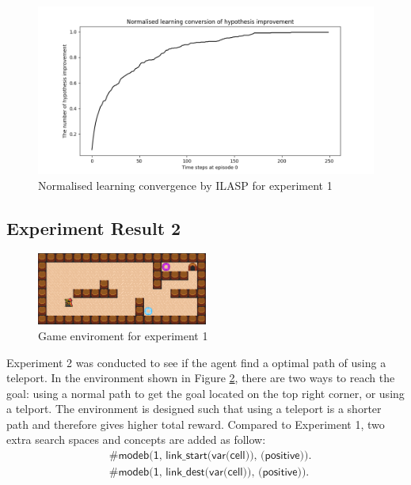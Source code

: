 \begin{figure}[!htb]
\centering
\includegraphics[width=1.0\textwidth]{./figures/experiment1_ilasp}
\caption{Normalised learning convergence by ILASP for experiment 1}
\label{experiment1_ilasp}
\end{figure}

\newpage
\subsection{Experiment Result 2}
\label{subsec:experiment_result_2}

\begin{figure}[!htb]
\centering
\includegraphics[width=0.5\textwidth]{./figures/experiment3}
\caption{Game enviroment for experiment 1}
\label{experiment3}
\end{figure}

Experiment 2 was conducted to see if the agent find a optimal path of using a teleport. In the environment shown in Figure \ref{experiment3},
there are two ways to reach the goal: using a normal path to get the goal located on the top right corner, or using a telport.
The environment is designed such that using a teleport is a shorter path and therefore gives higher total reward.
Compared to Experiment 1, two extra search spaces and concepts are added as follow:
\begin{equation*}
\begin{split}
&\textsf{\#modeb(1, link\_start(var(cell)), (positive)).}\\
&\textsf{\#modeb(1, link\_dest(var(cell)), (positive)).}
\end{split}
\end{equation*}


